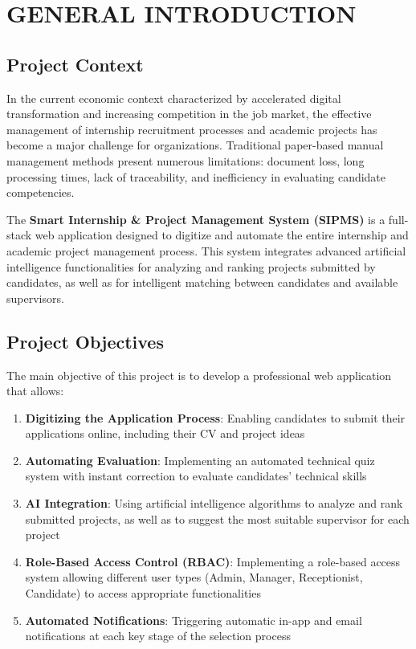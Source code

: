 \documentclass[12pt,a4paper]{report}
\begin{document}
\listoftables
{}

\chapter{GENERAL INTRODUCTION}

\section{Project Context}
In the current economic context characterized by accelerated digital transformation and increasing competition in the job market, the effective management of internship recruitment processes and academic projects has become a major challenge for organizations. Traditional paper-based manual management methods present numerous limitations: document loss, long processing times, lack of traceability, and inefficiency in evaluating candidate competencies.

The \textbf{Smart Internship \& Project Management System (SIPMS)} is a full-stack web application designed to digitize and automate the entire internship and academic project management process. This system integrates advanced artificial intelligence functionalities for analyzing and ranking projects submitted by candidates, as well as for intelligent matching between candidates and available supervisors.

\section{Project Objectives}
The main objective of this project is to develop a professional web application that allows:

\begin{enumerate}
    \item \textbf{Digitizing the Application Process}: Enabling candidates to submit their applications online, including their CV and project ideas
    \item \textbf{Automating Evaluation}: Implementing an automated technical quiz system with instant correction to evaluate candidates' technical skills
    \item \textbf{AI Integration}: Using artificial intelligence algorithms to analyze and rank submitted projects, as well as to suggest the most suitable supervisor for each project
    \item \textbf{Role-Based Access Control (RBAC)}: Implementing a role-based access system allowing different user types (Admin, Manager, Receptionist, Candidate) to access appropriate functionalities
    \item \textbf{Automated Notifications}: Triggering automatic in-app and email notifications at each key stage of the selection process
\end{enumerate}
\end{document}
